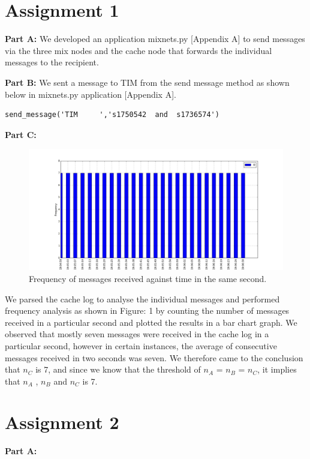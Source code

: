 \documentclass[preprint,12pt,3p]{elsarticle}
\begin{document}
\section*{Assignment 1}
\begin{flushleft}
\textbf{Part A:}
We developed an application mixnets.py [Appendix A] to send messages via the three mix nodes and the cache node that forwards the individual messages to the recipient. 
\newline

\textbf{Part B:}
We sent a message to TIM from the send message method as shown below in mixnets.py application [Appendix A]. 
\begin{verbatim}send_message('TIM     ','s1750542  and  s1736574') \end{verbatim}

\textbf{Part C:}

\begin{figure}[h]
\caption{Frequency of messages received against time in the same second.}
\centering
\includegraphics[width=\textwidth]{one_c}
\end{figure}

We parsed the cache log to analyse the individual messages and performed frequency analysis as shown in Figure: 1 by counting the number of messages received in a particular second and plotted the results in a bar chart graph. We observed that mostly seven messages were received in the cache log in a particular second, however in certain instances, the average of consecutive messages received in two seconds was seven. We therefore came to the conclusion that $n_C$ is 7, and since we know that the threshold of $n_A$ = $n_B$ = $n_C$, it implies that $n_A$ , $n_B$ and $n_C$ is 7.

\section*{Assignment 2}
\textbf{Part A:}
\newline


\end{flushleft}
\end{document}
